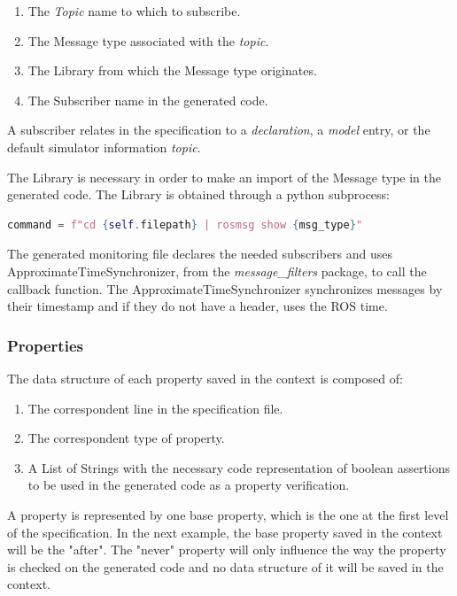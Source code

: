 \begin{enumerate}
    \item The \textit{Topic} name to which to subscribe.
    \item The Message type associated with the \textit{topic}.
    \item The Library from which the Message type originates.
    \item The Subscriber name in the generated code.
\end{enumerate}

A subscriber relates in the specification to a \textit{declaration}, a \textit{model} entry, or the default simulator information \textit{topic}.

The Library is necessary in order to make an import of the Message type in the generated code. The Library is obtained through a python subprocess:

\begin{lstlisting}[language=Python]
    command = f"cd {self.filepath} | rosmsg show {msg_type}"
\end{lstlisting}

The generated monitoring file declares the needed subscribers and uses ApproximateTimeSynchronizer, from the \textit{message\_filters} package, to call the callback function. The ApproximateTimeSynchronizer synchronizes messages by their timestamp and if they do not have a header, uses the ROS time.


\subsubsection{Properties}
\label{sssec:compileProp}

The data structure of each property saved in the context is composed of:

\begin{enumerate}
    \item The correspondent line in the specification file.
    \item The correspondent type of property.
    \item A List of Strings with the necessary code representation of boolean assertions to be used in the generated code as a property verification.
\end{enumerate}


A property is represented by one base property, which is the one at the first level of the specification. In the next example, the base property saved in the context will be the "after". The "never" property will only influence the way the property is checked on the generated code and no data structure of it will be saved in the context.

